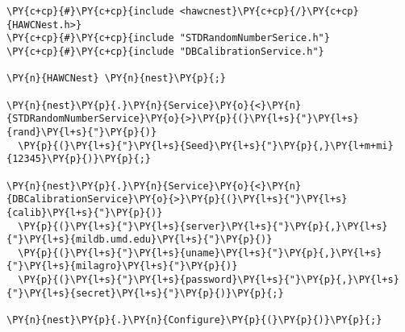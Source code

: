 \begin{Verbatim}[commandchars=\\\{\}]
\PY{c+cp}{#}\PY{c+cp}{include <hawcnest}\PY{c+cp}{/}\PY{c+cp}{HAWCNest.h>}
\PY{c+cp}{#}\PY{c+cp}{include "STDRandomNumberSerice.h"}
\PY{c+cp}{#}\PY{c+cp}{include "DBCalibrationService.h"}

\PY{n}{HAWCNest} \PY{n}{nest}\PY{p}{;}

\PY{n}{nest}\PY{p}{.}\PY{n}{Service}\PY{o}{<}\PY{n}{STDRandomNumberService}\PY{o}{>}\PY{p}{(}\PY{l+s}{"}\PY{l+s}{rand}\PY{l+s}{"}\PY{p}{)}
  \PY{p}{(}\PY{l+s}{"}\PY{l+s}{Seed}\PY{l+s}{"}\PY{p}{,}\PY{l+m+mi}{12345}\PY{p}{)}\PY{p}{;}

\PY{n}{nest}\PY{p}{.}\PY{n}{Service}\PY{o}{<}\PY{n}{DBCalibrationService}\PY{o}{>}\PY{p}{(}\PY{l+s}{"}\PY{l+s}{calib}\PY{l+s}{"}\PY{p}{)}
  \PY{p}{(}\PY{l+s}{"}\PY{l+s}{server}\PY{l+s}{"}\PY{p}{,}\PY{l+s}{"}\PY{l+s}{mildb.umd.edu}\PY{l+s}{"}\PY{p}{)}
  \PY{p}{(}\PY{l+s}{"}\PY{l+s}{uname}\PY{l+s}{"}\PY{p}{,}\PY{l+s}{"}\PY{l+s}{milagro}\PY{l+s}{"}\PY{p}{)}
  \PY{p}{(}\PY{l+s}{"}\PY{l+s}{password}\PY{l+s}{"}\PY{p}{,}\PY{l+s}{"}\PY{l+s}{secret}\PY{l+s}{"}\PY{p}{)}\PY{p}{;}

\PY{n}{nest}\PY{p}{.}\PY{n}{Configure}\PY{p}{(}\PY{p}{)}\PY{p}{;}
\end{Verbatim}
